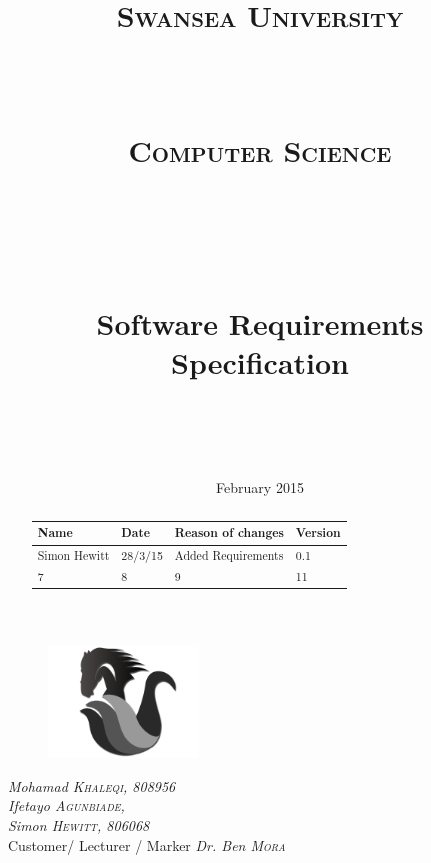 \documentclass[a4paper,10pt]{article}
\title{
\normalfont \normalsize 
\begin{LARGE} \textsc{Swansea University} \end{LARGE} \\ [15pt] %
\begin{large} \textsc{Computer Science} \end{large} \\ [15pt] %
\vspace{50px}
\horrule{0.5pt} \\[0.4cm] %
\begin{Huge}Software Requirements Specification \end{Huge}%
\horrule{2pt} \\[0.5cm] %
}
\author{} %
\date{} %
\begin{document}
\begin{titlepage}
\begin{figure}
  \centering
	\includegraphics[width=4cm]{swantech_chess_logo}
\end{figure}
\maketitle
\vspace{50px}
\begin{flushleft}
  \textit{Mohamad \textsc{Khaleqi}, 808956} \\
  \textit{Ifetayo \textsc{Agunbiade}, } \\
 \textit{Simon \textsc{Hewitt}, 806068} \\
  \hfill Customer/ Lecturer / Marker \textit{Dr. Ben \textsc{Mora}}
\end{flushleft}
\vfill
\center \date{\normalsize February 2015} %

\end{titlepage}
\pagebreak


\tableofcontents
\pagebreak
\justify


\renewcommand{\abstractname}{Revision History}
\begin{abstract}
\begin{center}
  \begin{tabular}{ |  p{3cm} | p{3cm} |  p{5cm} | p{2cm} |}
    \hline
    Name & Date & Reason of changes & Version \\ \hline \hline
    Simon Hewitt & 28/3/15 & Added Requirements & 0.1 \\ \hline 
    7 & 8 & 9 & 11 \\
    \hline
  \end{tabular}
\end{center}
\end{abstract}
\end{document}
